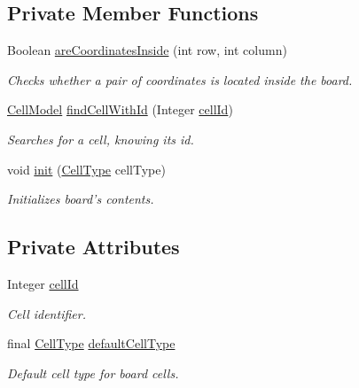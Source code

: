 \subsection*{Private Member Functions}
\begin{DoxyCompactItemize}
\item 
Boolean \hyperlink{classbattleship2D_1_1model_1_1BoardModel_a834c3bb01a7486857faab326f2c9af33}{are\-Coordinates\-Inside} (int row, int column)
\begin{DoxyCompactList}\small\item\em Checks whether a pair of coordinates is located inside the board. \end{DoxyCompactList}\item 
\hyperlink{classbattleship2D_1_1model_1_1CellModel}{Cell\-Model} \hyperlink{classbattleship2D_1_1model_1_1BoardModel_a84e362612177e2e6b989713bc5fff49f}{find\-Cell\-With\-Id} (Integer \hyperlink{classbattleship2D_1_1model_1_1BoardModel_a6a039e078208c6fe2df015b9b3e6bdf1}{cell\-Id})
\begin{DoxyCompactList}\small\item\em Searches for a cell, knowing its id. \end{DoxyCompactList}\item 
void \hyperlink{classbattleship2D_1_1model_1_1BoardModel_a3e3f9d28be068d3ec4f56be1e4fa4258}{init} (\hyperlink{enumbattleship2D_1_1model_1_1CellType}{Cell\-Type} cell\-Type)
\begin{DoxyCompactList}\small\item\em Initializes board's contents. \end{DoxyCompactList}\end{DoxyCompactItemize}
\subsection*{Private Attributes}
\begin{DoxyCompactItemize}
\item 
Integer \hyperlink{classbattleship2D_1_1model_1_1BoardModel_a6a039e078208c6fe2df015b9b3e6bdf1}{cell\-Id}
\begin{DoxyCompactList}\small\item\em Cell identifier. \end{DoxyCompactList}\item 
final \hyperlink{enumbattleship2D_1_1model_1_1CellType}{Cell\-Type} \hyperlink{classbattleship2D_1_1model_1_1BoardModel_a0b9c7c69532e0643f423711e0e5f478e}{default\-Cell\-Type}
\begin{DoxyCompactList}\small\item\em Default cell type for board cells. \end{DoxyCompactList}\end{DoxyCompactItemize}


